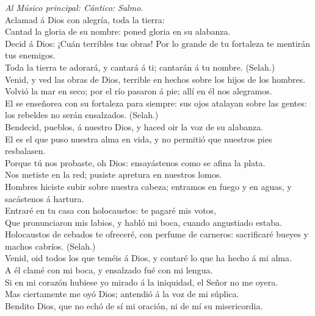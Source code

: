  \emph{Al Músico principal: Cántico: Salmo.}\\
Aclamad á Dios con alegría, toda la tierra:\\
 Cantad la gloria de su nombre: poned gloria en su
alabanza.\\
 Decid á Dios: ¡Cuán terribles tus obras! Por lo grande de
tu fortaleza te mentirán tus enemigos.\\
 Toda la tierra te adorará, y cantará á ti; cantarán á tu
nombre. (Selah.)\\
 Venid, y ved las obras de Dios, terrible en hechos sobre
los hijos de los hombres.\\
 Volvió la mar en seco; por el río pasaron á pie; allí en él
nos alegramos.\\
 El se enseñorea con su fortaleza para siempre: sus ojos
atalayan sobre las gentes: los rebeldes no serán ensalzados. (Selah.)\\
 Bendecid, pueblos, á nuestro Dios, y haced oir la voz de su
alabanza.\\
 El es el que puso nuestra alma en vida, y no permitió que
nuestros pies resbalasen.\\
 Porque tú nos probaste, oh Dios: ensayástenos como se
afina la plata.\\
 Nos metiste en la red; pusiste apretura en nuestros
lomos.\\
 Hombres hiciste subir sobre nuestra cabeza; entramos en
fuego y en aguas, y sacástenos á hartura.\\
 Entraré en tu casa con holocaustos: te pagaré mis votos,\\
 Que pronunciaron mis labios, y habló mi boca, cuando
angustiado estaba.\\
 Holocaustos de cebados te ofreceré, con perfume de
carneros: sacrificaré bueyes y machos cabríos. (Selah.)\\
 Venid, oid todos los que teméis á Dios, y contaré lo que
ha hecho á mi alma.\\
 A él clamé con mi boca, y ensalzado fué con mi lengua.\\
 Si en mi corazón hubiese yo mirado á la iniquidad, el
Señor no me oyera.\\
 Mas ciertamente me oyó Dios; antendió á la voz de mi
súplica.\\
 Bendito Dios, que no echó de sí mi oración, ni de mí su
misericordia.

